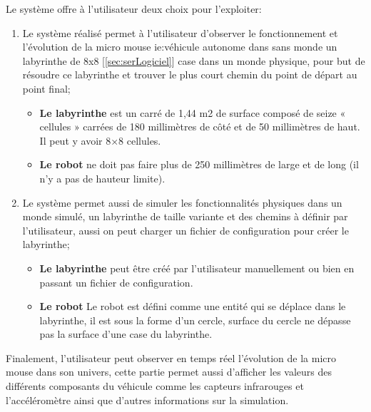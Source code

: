    Le système offre à l'utilisateur deux choix pour l'exploiter: \\
\begin{enumerate}

   \item Le système réalisé permet à l'utilisateur d'observer le fonctionnement
 et l'évolution de la micro mouse ie:véhicule autonome dans sans monde un 
 labyrinthe de 8x8 [\ref{sec:serLogiciel}] case dans un monde physique, pour 
 but de résoudre ce labyrinthe et trouver le plus court chemin du point de départ au point final; \\

\begin{itemize}
   \item \textbf{Le labyrinthe} est un carré de 1,44 m2 de surface composé de seize 
« cellules » carrées de 180 millimètres de côté et de 50 millimètres de haut. 
Il peut y avoir 8×8 cellules. \\

   \item \textbf{Le robot} ne doit pas faire plus de 250 millimètres de large 
et de long (il n’y a pas de hauteur limite).
\end{itemize}

   \item Le système permet aussi de simuler les fonctionnalités physiques 
dans un monde simulé, un labyrinthe de taille variante et des chemins à 
définir par l'utilisateur, aussi on peut charger un fichier de configuration 
pour créer le labyrinthe; \\

\begin{itemize}
   \item \textbf{Le labyrinthe} peut être créé par l'utilisateur manuellement 
   ou bien en passant un fichier de configuration.\\

   \item \textbf{Le robot} Le robot est défini comme une entité qui se déplace dans le labyrinthe, il est sous la forme d'un cercle, surface du cercle ne dépasse pas la surface d'une case du labyrinthe.\\
\end{itemize}
\end{enumerate}

   Finalement, l'utilisateur peut observer en temps réel l'évolution 
de la micro mouse dans son univers, cette partie permet aussi d'afficher 
les valeurs des différents composants du véhicule comme les capteurs infrarouges 
et l'accéléromètre ainsi que d'autres informations sur la simulation. \\

